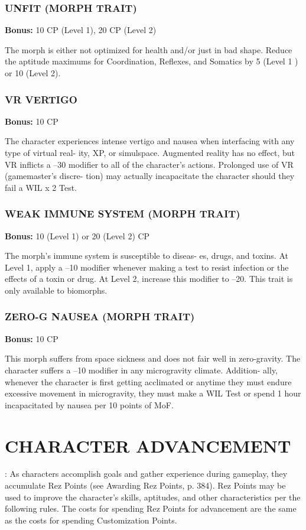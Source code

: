 \subsubsection{UNFIT (MORPH TRAIT)}
\textbf{Bonus:} 10 CP (Level 1), 20 CP (Level 2)

The morph is either not optimized for health and/or
just in bad shape. Reduce the aptitude maximums for
Coordination, Reflexes, and Somatics by 5 (Level 1 )
or 10 (Level 2).

\subsubsection{VR VERTIGO}
\textbf{Bonus:} 10 CP

The character experiences intense vertigo and
nausea when interfacing with any type of virtual real-
ity, XP, or simulspace. Augmented reality has no effect,
but VR inflicts a –30 modifier to all of the character’s
actions. Prolonged use of VR (gamemaster’s discre-
tion) may actually incapacitate the character should
they fail a WIL x 2 Test.

\subsubsection{WEAK IMMUNE SYSTEM (MORPH TRAIT)}
\textbf{Bonus:} 10 (Level 1) or 20 (Level 2) CP

The morph’s immune system is susceptible to diseas-
 es, drugs, and toxins. At Level 1, apply a –10 modifier
whenever making a test to resist infection or the effects
of a toxin or drug. At Level 2, increase this modifier to
–20. This trait is only available to biomorphs.

\subsubsection{ZERO-G NAUSEA (MORPH TRAIT)}
\textbf{Bonus:} 10 CP

This morph suffers from space sickness and does
not fair well in zero-gravity. The character suffers a
–10 modifier in any microgravity climate. Addition-
ally, whenever the character is first getting acclimated
or anytime they must endure excessive movement in
microgravity, they must make a WIL Test or spend 1
hour incapacitated by nausea per 10 points of MoF.




 \section{CHARACTER ADVANCEMENT}:
As characters accomplish goals and gather experience
during gameplay, they accumulate Rez Points (see
Awarding Rez Points, p. 384). Rez Points may be used
to improve the character’s skills, aptitudes, and other
characteristics per the following rules. The costs for
spending Rez Points for advancement are the same as
the costs for spending Customization Points.

